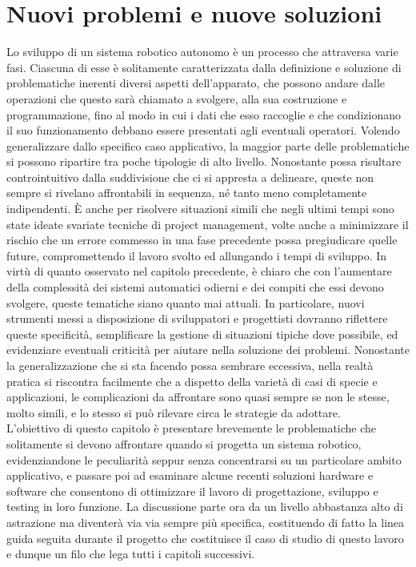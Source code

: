 
\chapter[Nuovi problemi e nuove soluzioni]{Nuovi problemi e nuove soluzioni}
\label{chap:Chapter2}
\doublespacing
\fontsize{14}{14}\selectfont

\indent Lo sviluppo di un sistema robotico autonomo è un processo che attraversa varie fasi. Ciascuna di esse è solitamente caratterizzata dalla definizione e soluzione di problematiche inerenti diversi aspetti dell'apparato, che possono andare dalle operazioni che questo sarà chiamato a svolgere, alla sua costruzione e programmazione, fino al modo in cui i dati che esso raccoglie e che condizionano il suo funzionamento debbano essere presentati agli eventuali operatori. Volendo generalizzare dallo specifico caso applicativo, la maggior parte delle problematiche si possono ripartire tra poche tipologie di alto livello. Nonostante possa risultare controintuitivo dalla suddivisione che ci si appresta a delineare, queste non sempre si rivelano affrontabili in sequenza, né tanto meno completamente indipendenti. È anche per risolvere situazioni simili che negli ultimi tempi sono state ideate svariate tecniche di project management, volte anche a minimizzare il rischio che un errore commesso in una fase precedente possa pregiudicare quelle future, compromettendo il lavoro svolto ed allungando i tempi di sviluppo. In virtù di quanto osservato nel capitolo precedente, è chiaro che con l'aumentare della complessità dei sistemi automatici odierni e dei compiti che essi devono svolgere, queste tematiche siano quanto mai attuali. In particolare, nuovi strumenti messi a disposizione di sviluppatori e progettisti dovranno riflettere queste specificità, semplificare la gestione di situazioni tipiche dove possibile, ed evidenziare eventuali criticità per aiutare nella soluzione dei problemi. Nonostante la generalizzazione che si sta facendo possa sembrare eccessiva, nella realtà pratica si riscontra facilmente che a dispetto della varietà di casi di specie e applicazioni, le complicazioni da affrontare sono quasi sempre se non le stesse, molto simili, e lo stesso si può rilevare circa le strategie da adottare.\\
L'obiettivo di questo capitolo è presentare brevemente le problematiche che solitamente si devono affrontare quando si progetta un sistema robotico, evidenziandone le peculiarità seppur senza concentrarsi su un particolare ambito applicativo, e passare poi ad esaminare alcune recenti soluzioni hardware e software che consentono di ottimizzare il lavoro di progettazione, sviluppo e testing in loro funzione. La discussione parte ora da un livello abbastanza alto di astrazione ma diventerà via via sempre più specifica, costituendo di fatto la linea guida seguita durante il progetto che costituisce il caso di studio di questo lavoro e dunque un filo che lega tutti i capitoli successivi.

